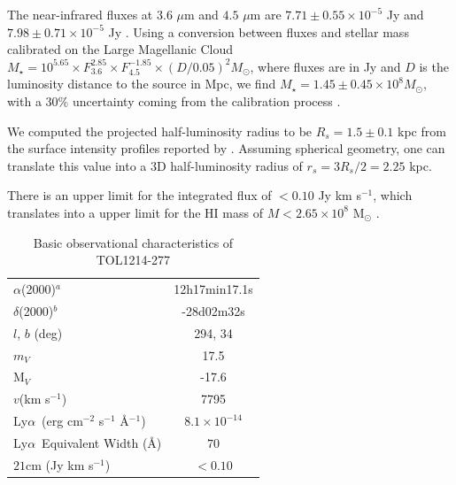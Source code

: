 \documentclass[a4,useAMS,usenatbib,usegraphicx]{mn2e}
\newcommand{\lya}{Ly$\alpha$}
\begin{document}
The near-infrared fluxes at $3.6$ $\mu$m and $4.5$ $\mu$m are
$7.71\pm0.55\times 10^{-5}$ Jy and $7.98\pm0.71\times 10^{-5}$ Jy
\citep{2008ApJ...678..804E}.
Using a conversion between fluxes and
stellar mass calibrated on the Large Magellanic Cloud $M_{\star} =
10^{5.65} \times F_{3.6}^{2.85} \times F_{4.5}^{-1.85} \times
(D/0.05)^2 M_{\odot}$, where fluxes are in Jy and $D$ is the luminosity
distance to the source in Mpc, we find $M_{\star} = 1.45\pm0.45\times 10^{8}
M_{\odot}$, with a $30\%$ uncertainty coming from the calibration
process \citep{2012AJ....143..139E}.  

We computed the projected half-luminosity radius to be $R_s=1.5\pm0.1$ kpc 
from the surface intensity profiles reported by \citep{2003A&A...410..481N}. 
Assuming spherical geometry, one can translate this value into a 3D
half-luminosity radius of $r_s=3R_s/2=2.25$ kpc.

There is an upper limit for the  
integrated flux of $<0.10$ Jy km s$^{-1}$, which translates into a
upper limit for the HI mass of $M<2.65\times 10^{8}$ M$_{\odot}$
\citep{pustilnikmartin07}.  



\begin{table}
\begin{center}
\begin{tabular}{lc}\hline
$\alpha$(2000)$^{a}$ & 12h17min17.1s\\
$\delta$(2000)$^{b}$ & -28d02m32s\\
$l$, $b$ (deg) & 294, 34\\
$m_V$ & 17.5\\
  M$_V$ & -17.6\\ 
$v$(km s$^{-1}$) & 7795\\
\lya\ (erg cm$^{-2}$ s$^{-1}$ \AA$^{-1}$)& $8.1\times 10^{-14}$ \\
\lya\ Equivalent Width (\AA) & $70$\\
$21$cm (Jy km s$^{-1}$)& $<0.10$ \\\hline
\end{tabular}
\end{center}
\caption{Basic observational characteristics of TOL1214-277
  \citep{Thuan97}\label{obstable}} 
\end{table}
\end{document}
